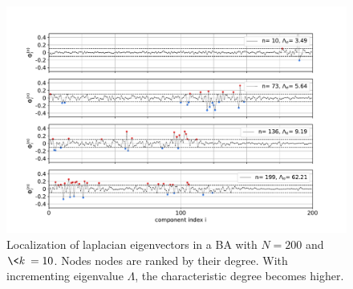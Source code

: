\begin{figure}[H]
\centering
\includegraphics[width =\textwidth]{latex_source/images/turing/eigenvectors_200.pdf}
\caption{Localization of laplacian eigenvectors in 
a BA with $N=200$ and $\<k\> = 10$. Nodes nodes are ranked by their degree. With incrementing eigenvalue $\Lambda$, the characteristic degree becomes higher.}
\label{fig:eigenvectors}
\end{figure}

